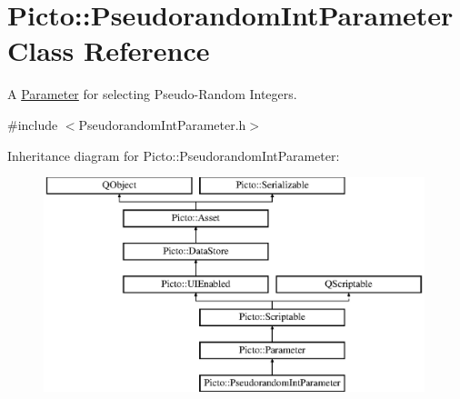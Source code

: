 \hypertarget{class_picto_1_1_pseudorandom_int_parameter}{\section{Picto\-:\-:Pseudorandom\-Int\-Parameter Class Reference}
\label{class_picto_1_1_pseudorandom_int_parameter}
}


A \hyperlink{class_picto_1_1_parameter}{Parameter} for selecting Pseudo-\/\-Random Integers.  




{\ttfamily \#include $<$Pseudorandom\-Int\-Parameter.\-h$>$}

Inheritance diagram for Picto\-:\-:Pseudorandom\-Int\-Parameter\-:\begin{figure}[H]
\begin{center}
\leavevmode
\includegraphics[height=6.251994cm]{class_picto_1_1_pseudorandom_int_parameter}
\end{center}
\end{figure}
